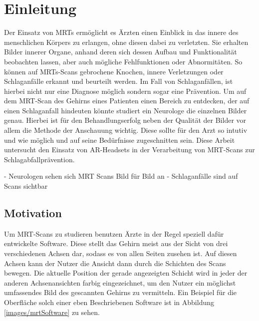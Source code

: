 
\chapter{Einleitung}

Der Einsatz von MRTs ermöglicht es Ärzten einen Einblick in das innere des menschlichen Körpers zu erlangen, ohne diesen dabei zu verletzten. Sie erhalten Bilder innerer Organe, anhand deren sich dessen Aufbau und Funktionalität beobachten lassen, aber auch mögliche Fehlfunktionen oder Abnormitäten. So können auf MRTs-Scans gebrochene Knochen, innere Verletzungen oder Schlaganfälle erkannt und beurteilt werden. Im Fall von Schlaganfällen, ist hierbei nicht nur eine Diagnose möglich sondern sogar eine Prävention. 
Um auf dem MRT-Scan des Gehirns eines Patienten einen Bereich zu entdecken, der auf einen Schlaganfall hindeuten könnte studiert ein Neurologe die einzelnen Bilder genau. Hierbei ist für den Behandlungserfolg neben der Qualität der Bilder vor allem die Methode der Anschauung wichtig. Diese sollte für den Arzt so intutiv und wie möglich und auf seine Bedürfnisse zugeschnitten sein. 
Diese Arbeit untersucht den Einsatz von AR-Headsets in der Verarbeitung von MRT-Scans zur Schlagabfallprävention.

- Neurologen sehen sich MRT Scans Bild für Bild an
- Schlaganfälle sind auf Scans sichtbar

\section{Motivation}

Um MRT-Scans zu studieren benutzen Ärzte in der Regel speziell dafür entwickelte Software. Diese stellt das Gehirn meist aus der Sicht von drei verschiedenen Achsen dar, sodass es von allen Seiten zusehen ist. Auf diesen Achsen kann der Nutzer die Ansicht dann durch die Schichten des Scans bewegen. Die aktuelle Position der gerade angezeigten Schicht wird in jeder der anderen Achsenansichten farbig eingezeichnet, um den Nutzer ein möglichst umfassendes Bild des gescannten Gehirns zu vermitteln. 
Ein Beispiel für die Oberfläche solch einer eben Beschriebenen Software ist in Abbildung \ref{images/mrtSoftware} zu sehen. 

